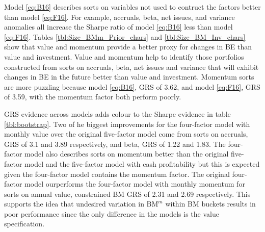 
Model \ref{eq:B16} describes sorts on
variables not used to contruct the factors better than model \ref{eq:F16}.
For example, accruals, beta, net issues, and variance anomalies all
increase the Sharpe ratio of model \ref{eq:B16} less than model \ref{eq:F16}.
Tables \ref{tbl:Size_BMm_Prior_chars} and \ref{tbl:Size_BM_Inv_chars} show that
value and momentum provide a better proxy for changes in BE than value and
investment.
Value and momentum help to identify those portfolios constructed from sorts on
accruals, beta, net issues and variance that will exhibit changes in BE in the
future better than value and investment.
Momentum sorts are more puzzling because model \ref{eq:B16}, GRS of 3.62,
and model \ref{eq:F16}, GRS of 3.59, with the momentum factor both perform
poorly.

GRS evidence across models adds colour to the Sharpe evidence in table
\ref{tbl:bootstrap}.
Two of he biggest improvements for the four-factor model with monthly value
over the original five-factor model come from sorts on accruals,
GRS of 3.1 and 3.89 respectively, and beta, GRS of 1.22 and 1.83.
The four-factor model also describes sorts on momentum better than the original
five-factor model and the five-factor model with cash profitability but this is
expected given the four-factor model contains the momentum factor.
The original four-factor model ourperforms the four-factor model with monthly
momentum for sorts on annual value, constrained BM GRS of 2.31 and 2.69
respectively.
This supports the idea that undesired variation in $\text{BM}^m$ within BM
buckets results in poor performance since the only difference in the models is
the value specification.

